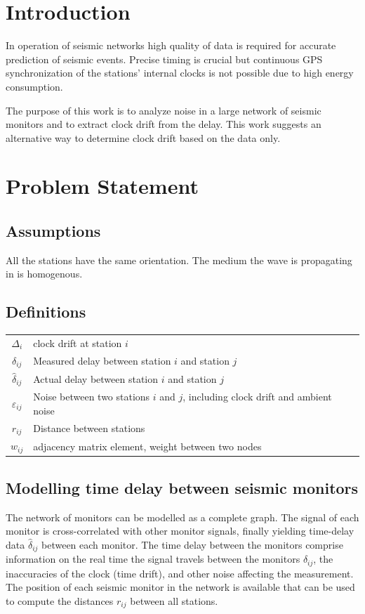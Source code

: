\documentclass[12pt, sumlimits, intlimits]{article}
\begin{document}

\clearpage

\tableofcontents

\clearpage

\section{Introduction}

In operation of seismic networks high quality of data is required for accurate prediction of seismic events. Precise timing is crucial but continuous GPS synchronization of the stations' internal clocks is not possible due to high energy consumption.

The purpose of this work is to analyze noise in a large network of seismic monitors and to extract clock drift from the delay.  This work suggests an alternative way to determine clock drift based on the data only.

\section{Problem Statement}
\subsection{Assumptions}
All the stations have the same orientation.
The medium the wave is propagating in is homogenous.
\subsection{Definitions}
\begin{tabular}{c| p{11cm}}
	$\Delta_i$ & clock drift at station $i$\\
	$\delta_{ij}$ & Measured delay between station $i$ and station $j$ \\
	$\hat{\delta}_{ij}$ & Actual delay between station $i$ and station $j$ \\
	$\varepsilon_{ij}$ & Noise between two stations $i$ and $j$, including clock drift and ambient noise \\
	$r_{ij}$ & Distance between stations \\
	$w_{ij}$ & adjacency matrix element, weight between two nodes
\end{tabular}

\subsection{Modelling time delay between seismic monitors}
The network of monitors can be modelled as a complete graph. The signal of each monitor is cross-correlated with other monitor signals, finally yielding time-delay data $\hat{\delta}_{ij}$ between each monitor. The time delay between the monitors comprise information on the real time the signal travels between the monitors $\delta_{ij}$, the inaccuracies of the clock (time drift), and other noise affecting the measurement. The position of each seismic monitor in the network is available that can be used to compute the distances $r_{ij}$ between all stations.
\end{document}

